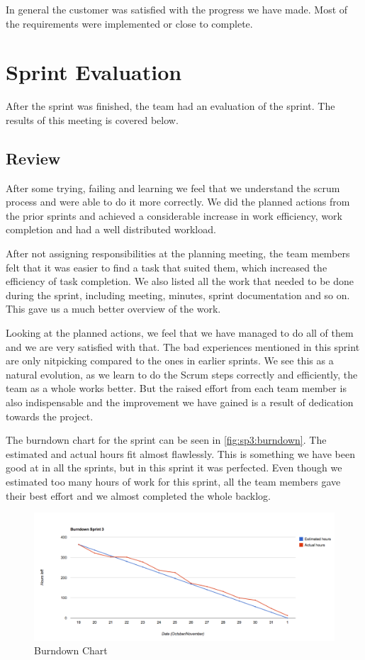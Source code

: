 In general the customer was satisfied with the progress we have made. Most of
the requirements were implemented or close to complete.


\section{Sprint Evaluation}
\label{sec:sp3:eval}
After the sprint was finished, the team had an evaluation of the sprint. The 
results of this meeting is covered below.

\subsection{Review}
After some trying, failing and learning we feel that we understand the \Gls{scrum} process and were able to do it more correctly. We did the planned actions from the prior sprints and achieved a considerable increase in work efficiency, work completion and had a well distributed workload.

After not assigning responsibilities at the planning meeting, the team members felt that it was easier to find a task that suited them, which increased the efficiency of task completion. We also listed all the work that needed to be done during the sprint, including meeting, minutes, sprint documentation and so on. This gave us a much better overview of the work.

Looking at the planned actions, we feel that we have managed to do all of them and we are very satisfied with that. The bad experiences mentioned in this sprint are only nitpicking compared to the ones in earlier sprints. We see this as a natural evolution, as we learn to do the Scrum steps correctly and efficiently, the team as a whole works better.
But the raised effort from each team member is also indispensable and the improvement we have gained is a result of dedication towards the project.

The burndown chart for the sprint can be seen in \autoref{fig:sp3:burndown}. The estimated and actual hours fit almost flawlessly. This is something we have been good at in all the sprints, but in this sprint it was perfected. Even though we estimated too many hours of work for this sprint, all the team members gave their best effort and we almost completed the whole backlog. 
\begin{figure}[!htb]
	\includegraphics[width=\textwidth]{./sprints/img/burndown_chart_s3}
	\caption{Burndown Chart\label{fig:sp3:burndown}}
\end{figure}

